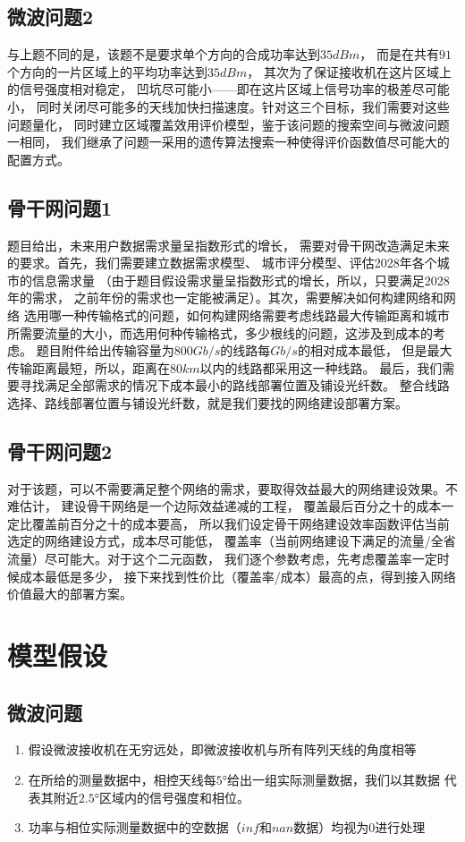 \documentclass[UTF8,12pt]{ctexart}
\begin{document}
\subsection{微波问题2}
与上题不同的是，该题不是要求单个方向的合成功率达到$35dBm$，
而是在共有$91$个方向的一片区域上的平均功率达到$35dBm$，
其次为了保证接收机在这片区域上的信号强度相对稳定，
凹坑尽可能小——即在这片区域上信号功率的极差尽可能小，
同时关闭尽可能多的天线加快扫描速度。针对这三个目标，我们需要对这些问题量化，
同时建立区域覆盖效用评价模型，鉴于该问题的搜索空间与微波问题一相同，
我们继承了问题一采用的遗传算法搜索一种使得评价函数值尽可能大的配置方式。
\newpage
\subsection{骨干网问题1}
题目给出，未来用户数据需求量呈指数形式的增长，
需要对骨干网改造满足未来的要求。首先，我们需要建立数据需求模型、
城市评分模型、评估2028年各个城市的信息需求量
（由于题目假设需求量呈指数形式的增长，所以，只要满足2028年的需求，
之前年份的需求也一定能被满足）。其次，需要解决如何构建网络和网络
选用哪一种传输格式的问题，如何构建网络需要考虑线路最大传输距离和城市
所需要流量的大小，而选用何种传输格式，多少根线的问题，这涉及到成本的考虑。
题目附件给出传输容量为$800Gb/s$的线路每$Gb/s$的相对成本最低，
但是最大传输距离最短，所以，距离在$80km$以内的线路都采用这一种线路。
最后，我们需要寻找满足全部需求的情况下成本最小的路线部署位置及铺设光纤数。
整合线路选择、路线部署位置与铺设光纤数，就是我们要找的网络建设部署方案。

\subsection{骨干网问题2}
对于该题，可以不需要满足整个网络的需求，要取得效益最大的网络建设效果。不难估计，
建设骨干网络是一个边际效益递减的工程，
覆盖最后百分之十的成本一定比覆盖前百分之十的成本要高，
所以我们设定骨干网络建设效率函数评估当前选定的网络建设方式，成本尽可能低，
覆盖率（当前网络建设下满足的流量/全省流量）尽可能大。对于这个二元函数，
我们逐个参数考虑，先考虑覆盖率一定时候成本最低是多少，
接下来找到性价比（覆盖率/成本）最高的点，得到接入网络价值最大的部署方案。




\newpage
\section{模型假设}\label{mxjs}
\subsection{微波问题}
\begin{enumerate}
    \item 假设微波接收机在无穷远处，即微波接收机与所有阵列天线的角度相等
    \item 在所给的测量数据中，相控天线每$5°$给出一组实际测量数据，我们以其数据
          代表其附近$2.5°$区域内的信号强度和相位。
    \item 功率与相位实际测量数据中的空数据（$inf$和$nan$数据）均视为0进行处理
\end{enumerate}
\end{document}
